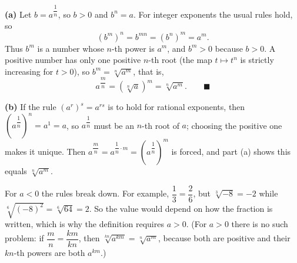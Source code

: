 \textbf{(a)} Let $b=a^{\dfrac{1}{n}}$, so $b>0$ and $b^n=a$. For integer exponents the usual rules hold, so
\[
\left(b^m\right)^n=b^{mn}=\left(b^n\right)^m=a^m .
\]
Thus $b^m$ is a number whose $n$-th power is $a^m$, and $b^m>0$ because $b>0$. A positive number has only one positive $n$-th root (the map $t\mapsto t^n$ is strictly increasing for $t>0$), so $b^m=\sqrt[n]{a^m}$, that is,
\[
a^{\dfrac{m}{n}}=\left(\sqrt[n]{a}\right)^m=\sqrt[n]{a^m}. \qquad\blacksquare
\]

\textbf{(b)} If the rule $\left(a^r\right)^s=a^{rs}$ is to hold for rational exponents, then $\left(a^{\dfrac{1}{n}}\right)^n=a^1=a$, so $a^{\dfrac{1}{n}}$ must be an $n$-th root of $a$; choosing the positive one makes it unique. Then $a^{\dfrac{m}{n}}=a^{\dfrac{1}{n}\cdot m}=\left(a^{\dfrac{1}{n}}\right)^m$ is forced, and part (a) shows this equals $\sqrt[n]{a^m}$.

For $a<0$ the rules break down. For example, $\dfrac{1}{3}=\dfrac{2}{6}$, but $\sqrt[3]{-8}=-2$ while $\sqrt[6]{(-8)^2}=\sqrt[6]{64}=2$. So the value would depend on how the fraction is written, which is why the definition requires $a>0$. (For $a>0$ there is no such problem: if $\dfrac{m}{n}=\dfrac{km}{kn}$, then $\sqrt[kn]{a^{km}}=\sqrt[n]{a^m}$, because both are positive and their $kn$-th powers are both $a^{km}$.)
